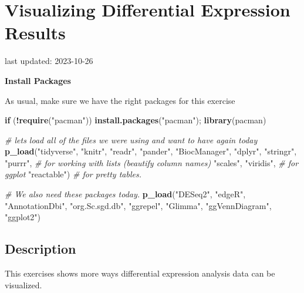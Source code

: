 \documentclass[
]{book}
\newenvironment{Shaded}{\begin{snugshade}}{\end{snugshade}}
\newcommand{\CommentTok}[1]{\textcolor[rgb]{0.56,0.35,0.01}{\textit{#1}}}
\newcommand{\ControlFlowTok}[1]{\textcolor[rgb]{0.13,0.29,0.53}{\textbf{#1}}}
\newcommand{\FunctionTok}[1]{\textcolor[rgb]{0.13,0.29,0.53}{\textbf{#1}}}
\newcommand{\NormalTok}[1]{#1}
\newcommand{\SpecialCharTok}[1]{\textcolor[rgb]{0.81,0.36,0.00}{\textbf{#1}}}
\newcommand{\StringTok}[1]{\textcolor[rgb]{0.31,0.60,0.02}{#1}}
\begin{document}
\hypertarget{visualizing-differential-expression-results}{%
\chapter{Visualizing Differential Expression Results}\label{visualizing-differential-expression-results}}

last updated: 2023-10-26

\textbf{Install Packages}

As usual, make sure we have the right packages for this exercise

\begin{Shaded}
\begin{Highlighting}[]
\ControlFlowTok{if}\NormalTok{ (}\SpecialCharTok{!}\FunctionTok{require}\NormalTok{(}\StringTok{"pacman"}\NormalTok{)) }\FunctionTok{install.packages}\NormalTok{(}\StringTok{"pacman"}\NormalTok{); }\FunctionTok{library}\NormalTok{(pacman)}

\CommentTok{\# let\textquotesingle{}s load all of the files we were using and want to have again today}
\FunctionTok{p\_load}\NormalTok{(}\StringTok{"tidyverse"}\NormalTok{, }\StringTok{"knitr"}\NormalTok{, }\StringTok{"readr"}\NormalTok{,}
       \StringTok{"pander"}\NormalTok{, }\StringTok{"BiocManager"}\NormalTok{, }
       \StringTok{"dplyr"}\NormalTok{, }\StringTok{"stringr"}\NormalTok{, }
       \StringTok{"purrr"}\NormalTok{, }\CommentTok{\# for working with lists (beautify column names)}
       \StringTok{"scales"}\NormalTok{, }\StringTok{"viridis"}\NormalTok{, }\CommentTok{\# for ggplot}
       \StringTok{"reactable"}\NormalTok{) }\CommentTok{\# for pretty tables.}

\CommentTok{\# We also need these packages today.}
\FunctionTok{p\_load}\NormalTok{(}\StringTok{"DESeq2"}\NormalTok{, }\StringTok{"edgeR"}\NormalTok{, }\StringTok{"AnnotationDbi"}\NormalTok{, }\StringTok{"org.Sc.sgd.db"}\NormalTok{,}
       \StringTok{"ggrepel"}\NormalTok{,}
       \StringTok{"Glimma"}\NormalTok{,}
       \StringTok{"ggVennDiagram"}\NormalTok{, }\StringTok{"ggplot2"}\NormalTok{)}
\end{Highlighting}
\end{Shaded}

\hypertarget{description-5}{%
\section{Description}\label{description-5}}

This exercises shows more ways differential expression analysis data can be visualized.
\end{document}
